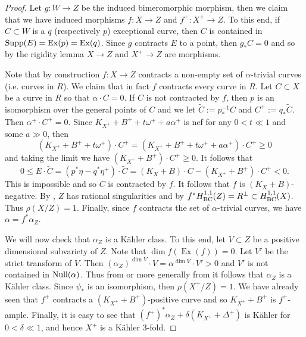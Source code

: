 \documentclass[12pt]{amsart}
\theoremstyle{plain}
\theoremstyle{remark}
\theoremstyle{definition}
\newcommand{\<}{\leq}
\def\Ex{\operatorname{Ex}}
\def\dim{\operatorname{dim}}
\theoremstyle{definition}
\theoremstyle{definition}
\numberwithin{equation}{section}
\theoremstyle{remark}
\begin{document}
\begin{proof}
Let $g:W\to Z$ be the induced bimeromorphic morphism, then we claim that we have induced morphisms $f:X\to Z$ and $f^+:X^+\to Z$. To this end, if $C\subset W$ is a $q$ (respectively $p$) exceptional curve, then $C$ is contained in ${\rm Supp}(E)=\Ex(p)=\Ex(q)$. %
Since $g$ contracts $E$ to a point, then
$g_*C=0$ and so by the rigidity lemma $X\to Z$ and $X^+\to Z$ are morphisms.

Note that by construction $f:X\to Z$ contracts a non-empty set of $\alpha$-trivial curves (i.e. curves in $R$). We claim that in fact $f$ contracts every curve in $R$. Let $C\subset X$ be a curve in $R$ so that $\alpha \cdot C=0$. If $C$ is not contracted by $f$, then $p$ is an isomorphism over the general points of $C$ and we let $\tilde C:=p^{-1}_*C$ and $C^+:=q_* \tilde C$. Then $\alpha ^+\cdot C^+=0$.
Since $K_{X^+}+B^++t\omega ^++a\alpha ^+$ is nef for any $0<t\ll 1$ and some $a\gg 0$, then
\[(K_{X^+}+B^++t\omega ^+)\cdot C^+=(K_{X^+}+B^++t\omega ^++a\alpha ^+)\cdot C^+\geq 0\]
and taking the limit we have $(K_{X^+}+B^+)\cdot C^+\geq 0$.
It follows that
\[0\leq E\cdot \tilde C=(p^*\eta -q^*\eta ^+)\cdot \tilde C=(K_X+B)\cdot C-(K_{X^+}+B^+)\cdot C^+<0.\]
This is impossible and so $C$ is contracted by $f$.
 It follows that  $f$ is $(K_X+B)$-negative. By \cite[Lemma 2.41]{DH20}, $Z$ has rational singularities and by \cite[Lemma 3.3]{HP16} $f^*H^{1,1}_{\rm BC}(Z)=R^\perp\subset H^{1,1}_{\rm BC}(X)$.
Thus $\rho (X/Z)=1$.
Finally, since $f$ contracts the set of $\alpha$-trivial curves, we have $\alpha =f^*\alpha _Z$. 

We will now check that $\alpha _Z$ is a K\"ahler class. 
To this end, let $V\subset Z$ be a positive dimensional subvariety of $Z$.    Note that $ \dim f(\Ex(f))=0$. Let $V'$ be the strict transform of $V$. Then $(\alpha_{Z})^{\dim V}\cdot V={\alpha}^{\dim V}\cdot V'>0$ and $V'$ is not contained in ${\rm Null}(\alpha)$.  Thus from \cite[Lemma 6.3]{DH20} or more generally from \cite[Theorem 2.30]{DHP22} it follows that $\alpha_{Z}$ is a K\"ahler class. 
Since $\psi _*$ is an isomorphism, then $\rho (X^+/Z)=1$.
We have already seen that $f^+$ contracts a $(K_{X^+}+B^+)$-positive curve and so $K_{X^+}+B^+$ is $f^+$-ample.
Finally, it is  easy to see that $(f^+)^*\alpha _Z+\delta (K_{X^+}+\Delta ^+)$ is K\"ahler for $0<\delta\ll 1$, and hence $X^+$ is a K\"ahler $3$-fold.
   

\end{proof}~\\
\end{document}
